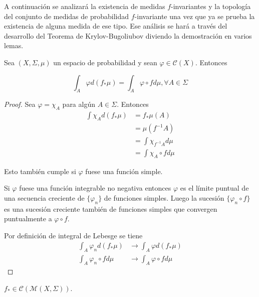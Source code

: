 A continuación se analizará la existencia de medidas $f$-invariantes y la topología del conjunto de medidas de probabilidad $f$-invariante una vez que ya se prueba la existencia de alguna medida de ese tipo. Ese análisis se hará a través del desarrollo del Teorema de Krylov-Bugoliubov diviendo la demostración en varios lemas.

\begin{lema}\label{lema1_krylov-bugoliubov}
	Sea $(X,\Sigma,\mu)$ un espacio de probabilidad y sean $\varphi \in \mathcal{C}(X)$. Entonces
	
	\begin{equation}
		\int_A \varphi d(f_*\mu)=\int_A \varphi \circ f d\mu, \forall A \in \Sigma
	\end{equation}
\end{lema}

\begin{proof}
	Sea $\varphi = \chi_A$ para algún $A \in \Sigma$. Entonces
	\begin{align}
		\int \chi_A d(f_* \mu) &= f_* \mu(A)\\
		&= \mu(f^{-1} A)\\
		&= \int \chi_{f^{-1}A} d\mu\\
		&= \int \chi_A \circ f d\mu
	\end{align}
	
	Esto también cumple si $\varphi$ fuese una función simple.
	
	Si $\varphi$ fuese una función integrable no negativa entonces $\varphi$ es el límite puntual de una secuencia creciente de $\{ \varphi_n \}$ de funciones simples. Luego la sucesión $\{ \varphi_n \circ f \}$ es una sucesión creciente también de funciones simples que convergen puntualmente a $\varphi \circ f$.
	
	Por definición de integral de Lebesge se tiene
	\begin{align}
		\int_A \varphi_n d(f_* \mu) &\rightarrow \int_A \varphi d(f_* \mu)\\
		\int_A \varphi_n \circ f d\mu &\rightarrow \int_A \varphi \circ f d\mu
	\end{align}
\end{proof}

\begin{lema}
	$f_* \in \mathcal{C}(\mathcal{M}(X,\Sigma))$. 
\end{lema}

